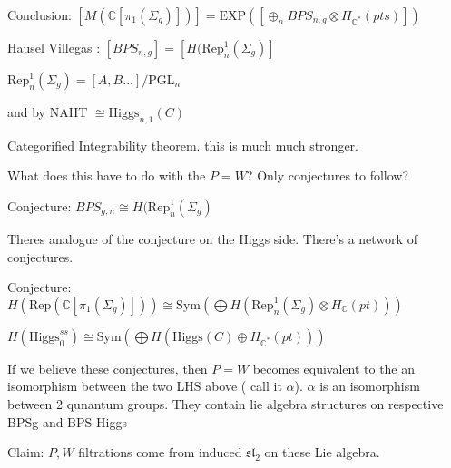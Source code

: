 Conclusion: $[ M(\mathbb{C} [\pi_1 ( \Sigma_g) ] ) ] = \mathrm{EXP} ([\oplus _n BPS_{n,g} \otimes H_{\mathbb{C} ^* } ( pts) ] ) $

Hausel Villegas : $[BPS _{n,g} ] = [ H( \mathrm{Rep}_n ^1 ( \Sigma_g) ] $ 

$ \mathrm{Rep}_n ^1 (\Sigma_g ) = [A, B ...] / \mathrm{PGL}_n $

and by NAHT $ \cong \mathrm{Higgs}_{n,1} ( C) $ 

Categorified Integrability theorem. 
this is much much stronger. 

What does this have to do with the $P=W $?
Only conjectures to follow?

Conjecture: 
$ BPS_{g,n} \cong H( \mathrm{Rep} _n ^1 ( \Sigma_g ) $

Theres analogue of the conjecture on the Higgs side. 
There's a network of conjectures. 

Conjecture: 
$H(\mathrm{Rep} ( \mathbb{C} [\pi_1(\Sigma_g)] )) \cong \mathrm{Sym} ( \bigoplus H(\mathrm{Rep}_n ^1 ( \Sigma_g ) \otimes H_\mathbb{C} (pt) ) ) $

$ H(\mathrm{Higgs} _{0} ^{ss} ) \cong \mathrm{Sym} ( \bigoplus H( \mathrm{Higgs} ( C)  \oplus H_{\mathbb{C} ^*} (pt) )) $ 

If we believe these conjectures, 
then $P = W $ becomes equivalent to the an isomorphism between the two LHS above ( call it $\alpha$). 
$\alpha$ is an isomorphism between 2 qunantum groups. 
They contain lie algebra structures on respective BPSg and BPS-Higgs 

Claim: $P, W$ filtrations come from induced $\mathfrak{sl}_2 $ on these Lie algebra. 











 

